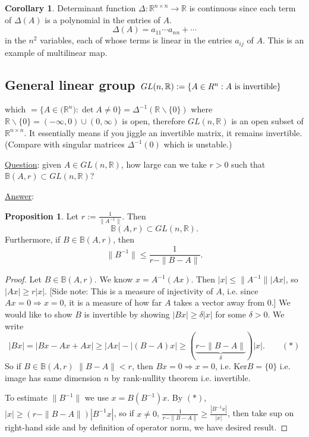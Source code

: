 \documentclass[a4paper]{article}
\theoremstyle{definition}
\newcommand{\Ker}{\text{Ker}}
\newtheorem{prop}[defn]{Proposition}
\newtheorem{coro}[defn]{Corollary}
\begin{document}
\begin{coro}
Determinant function $\Delta :\mathbb R^{n\times n}\rightarrow \mathbb R$ is continuous since each term of $\Delta (A)$ is a polynomial in the entries of $A$.
\[
\Delta(A)=a_{11}\cdots a_{nn}+\cdots
\]
in the $n^2$ variables, each of whose terms is linear in the entries $a_{ij}$ of $A$. This is an example of multilinear map.
\end{coro}

\subsection{General linear group $GL(n,\mathbb R):=\{A\in\mathcal \mathbb R^n: A\text{ is invertible}\}$}
which $=\{A\in\mathcal (\mathbb R^n): \det A\neq 0\}=\Delta ^{-1} (\mathbb R\backslash \{0\})$ where $\mathbb R\backslash \{0\} = (-\infty,0)\cup (0,\infty)$ is open, therefore $GL(n,\mathbb R)$ is an open subset of $\mathbb R^{n\times n}$. It essentially means if you jiggle an invertible matrix, it remains invertible. (Compare with singular matrices $\Delta^{-1} (0)$ which is unstable.)

\underline{Question}: given $A\in GL(n,\mathbb R)$, how large can we take $r>0$ such that $\mathbb B(A,r) \subset GL(n,\mathbb R)$?

\underline{Answer}:\begin{prop}
Let $r:=\frac{1}{\|A^{-1}\|}$. Then
\[
\mathbb B\left(A,r\right) \subset GL(n,\mathbb R).
\]
Furthermore, if $B\in \mathbb B(A,r)$, then
\[
\|B^{-1}\| \leq \frac{1}{r-\|B-A\|}.
\]
\end{prop}
\begin{proof}
Let $B\in \mathbb B(A,r)$. We know $x=A^{-1}(Ax)$. Then $|x| \leq \|A^{-1}\| |Ax|$, so $|Ax| \geq r|x|$. [Side note: This is a measure of injectivity of $A$, i.e. since $Ax=0\Rightarrow x=0$, it is a measure of how far $A$ takes a vector away from 0.] We would like to show $B$ is invertible by showing $|Bx| \geq \delta |x|$ for some $\delta>0$. We write
\[
|Bx|=|Bx-Ax+Ax| \geq |Ax|-|(B-A)x| \geq (\underbrace{r-\|B-A\|}_{\delta})|x| . \qquad (\ast)
\]
So if $B\in \mathbb B(A,r)$ $\|B-A\|<r$, then $Bx=0 \Rightarrow x=0$, i.e. $\Ker B=\{0\}$ i.e. image has same dimension $n$ by rank-nullity theorem i.e. invertible.

To estimate $\|B^{-1}\|$ we use $x=B(B^{-1})x$. By $(\ast)$, $|x|\geq (r-\|B-A\|) |B^{-1}x|$, so if $x\neq 0$, $\frac{1}{r-\|B-A\|} \geq \frac{|B^{-1}x|}{|x|}$, then take sup on right-hand side and by definition of operator norm, we have desired result.
\end{proof}
\end{document}
